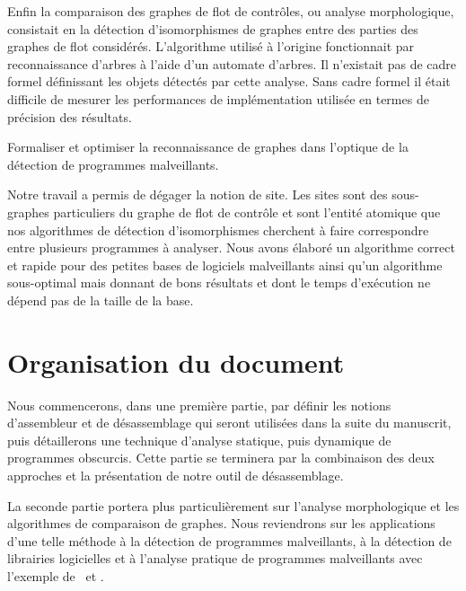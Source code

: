 Enfin la comparaison des graphes de flot de contrôles, ou analyse morphologique, consistait en la détection d'isomorphismes de graphes entre des parties des graphes de flot considérés. 
L'algorithme utilisé à l'origine fonctionnait par reconnaissance d'arbres à l'aide d'un automate d'arbres. Il n'existait pas de cadre formel définissant les objets détectés par cette analyse. Sans cadre formel il était difficile de mesurer les performances de implémentation utilisée en termes de précision des résultats.

\begin{pb}
 Formaliser et optimiser la reconnaissance de graphes dans l'optique de la détection de programmes malveillants.
\end{pb}

Notre travail a permis de dégager la notion de site. Les sites sont des sous-graphes particuliers du graphe de flot de contrôle et sont l'entité atomique que nos algorithmes de détection d'isomorphismes cherchent à faire correspondre entre plusieurs programmes à analyser. Nous avons élaboré un algorithme correct et rapide pour des petites bases de logiciels malveillants ainsi qu'un algorithme sous-optimal mais donnant de bons résultats et dont le temps d'exécution ne dépend pas de la taille de la base.

\section{Organisation du document}

Nous commencerons, dans une première partie, par définir les notions d'assembleur et de désassemblage qui seront utilisées dans la suite du manuscrit, puis détaillerons une technique d'analyse statique, puis dynamique de programmes obscurcis. Cette partie se terminera par la combinaison des deux approches et la présentation de notre outil de désassemblage.

La seconde partie portera plus particulièrement sur l'analyse morphologique et les algorithmes de comparaison de graphes. Nous reviendrons sur les applications d'une telle méthode à la détection de programmes malveillants, à la détection de librairies logicielles et à l'analyse pratique de programmes malveillants avec l'exemple de \duqu\ et \stux.